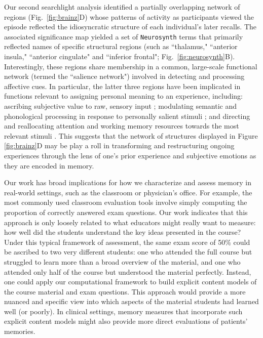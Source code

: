 \documentclass{article}
\begin{document}
Our second searchlight analysis identified a partially overlapping network of regions (Fig.~\ref{fig:brainz}D) whose patterns of activity as participants viewed the episode reflected the idiosyncratic structure of each individual's later recalls.  The associated significance map yielded a set of \texttt{Neurosynth} terms that primarily reflected names of specific structural regions (such as ``thalamus," ``anterior insula," ``anterior cingulate" and ``inferior frontal"; Fig.~\ref{fig:neurosynth}B).  Interestingly, these regions share membership in a common, large-scale functional network (termed the ``salience network") involved in detecting and processing affective cues.  In particular, the latter three regions have been implicated in functions relevant to assigning personal meaning to an experience, including: ascribing subjective value to raw, sensory input \citep{MedfCrit10}; modulating semantic and phonological processing in response to personally salient stimuli \citep{KellEtal07b}; and directing and reallocating attention and working memory resources towards the most relevant stimuli \citep{MenoUddi10}.  This suggests that the network of structures displayed in Figure \ref{fig:brainz}D may be play a roll in transforming and restructuring ongoing experiences through the lens of one's prior experience and subjective emotions as they are encoded in memory.

Our work has broad implications for how we characterize and assess memory in real-world settings, such as the classroom or physician's office.  For example, the most commonly used classroom evaluation tools involve simply computing the proportion of correctly answered exam questions.  Our work indicates that this approach is only loosely related to what educators might really want to measure: how well did the students understand the key ideas presented in the course?  Under this typical framework of assessment, the same exam score of 50\% could be ascribed to two very different students: one who attended the full course but struggled to learn more than a broad overview of the material, and one who attended only half of the course but understood the material perfectly.  Instead, one could apply our computational framework to build explicit content models of the course material and exam questions.  This approach would provide a more nuanced and specific view into which aspects of the material students had learned well (or poorly).  In clinical settings, memory measures that incorporate such explicit content models might also provide more direct evaluations of patients' memories.
\end{document}
